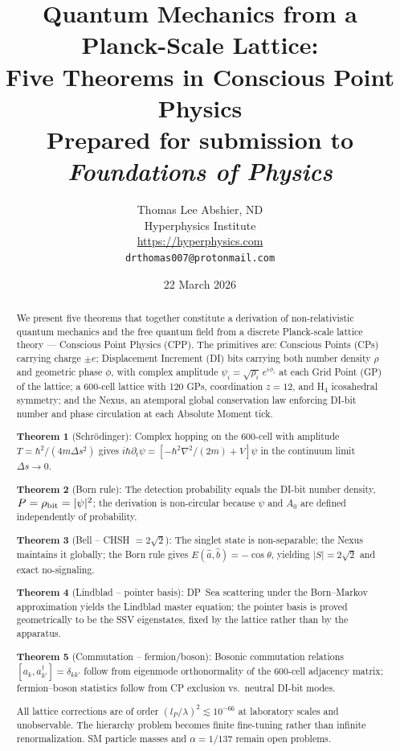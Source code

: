 \documentclass[11pt,a4paper]{article}
\title{\textbf{Quantum Mechanics from a Planck-Scale Lattice:\\
Five Theorems in Conscious Point Physics}\\[8pt]
{\normalsize Prepared for submission to \textit{Foundations of Physics}}}
\author{Thomas Lee Abshier, ND\\
Hyperphysics Institute\\
\url{https://hyperphysics.com}\\
\texttt{drthomas007@protonmail.com}}
\date{22 March 2026}
\newcommand{\lP}{l_P}
\begin{document}
\maketitle

\begin{abstract}
We present five theorems that together constitute a derivation of
non-relativistic quantum mechanics and the free quantum field from
a discrete Planck-scale lattice theory — Conscious Point Physics (CPP).
The primitives are: Conscious Points (CPs) carrying charge $\pm e$;
Displacement Increment (DI) bits carrying both number density $\rho$ and
geometric phase $\phi$, with complex amplitude
$\psi_i = \sqrt{\rho_i}\,e^{i\phi_i}$ at each Grid Point (GP) of the
lattice; a 600-cell lattice with 120 GPs, coordination $z=12$, and
H$_4$ icosahedral symmetry; and the Nexus, an atemporal global
conservation law enforcing DI-bit number and phase circulation at each
Absolute Moment tick.

\textbf{Theorem 1} (Schr\"{o}dinger): Complex hopping on the 600-cell
with amplitude $T = \hbar^2/(4m\Delta s^2)$ gives
$i\hbar\partial_t\psi = [-\hbar^2\nabla^2/(2m) + V]\psi$ in the
continuum limit $\Delta s \to 0$.

\textbf{Theorem 2} (Born rule): The detection probability equals the
DI-bit number density, $P = \rho_{\rm bit} = |\psi|^2$; the
derivation is non-circular because $\psi$ and $A_0$ are defined
independently of probability.

\textbf{Theorem 3} (Bell -- CHSH $= 2\sqrt{2}$): The singlet state is
non-separable; the Nexus maintains it globally; the Born rule gives
$E(\hat{a},\hat{b}) = -\cos\theta$, yielding $|S| = 2\sqrt{2}$ and
exact no-signaling.

\textbf{Theorem 4} (Lindblad -- pointer basis): DP~Sea scattering
under the Born--Markov approximation yields the Lindblad master
equation; the pointer basis is proved geometrically to be the SSV
eigenstates, fixed by the lattice rather than by the apparatus.

\textbf{Theorem 5} (Commutation -- fermion/boson): Bosonic
commutation relations $[a_k, a_{k'}^\dagger] = \delta_{kk'}$ follow
from eigenmode orthonormality of the 600-cell adjacency matrix;
fermion--boson statistics follow from CP exclusion vs.\ neutral
DI-bit modes.

All lattice corrections are of order $(\lP/\lambda)^2 \lesssim 10^{-66}$
at laboratory scales and unobservable. The hierarchy problem becomes
finite fine-tuning rather than infinite renormalization. SM particle
masses and $\alpha = 1/137$ remain open problems.
\end{abstract}
\end{document}
